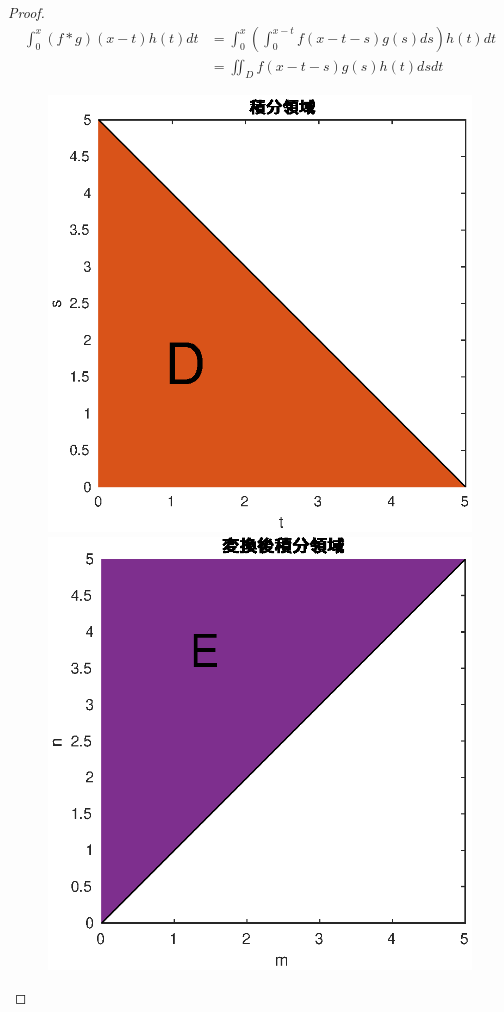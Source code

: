 \documentclass[dvipdfmx]{jreport}
\begin{document}
\begin{proof}
\begin{equation}
\begin{aligned}
\int_0^x \left( f*g \right) (x-t) h(t)dt &= \int_0^x \left( \int_0^{x-t} f(x-t-s) g(s) ds \right) h(t) dt \\
					 &= \iint_{D} f(x-t-s)g(s)h(t)dsdt
\end{aligned}\label{eq:1}
\end{equation}
	\begin{figure}[H]
		\includegraphics[scale=0.3]{1.eps}
		\includegraphics[scale=0.3]{2.eps}

\end{figure}
\end{proof}
\end{document}
